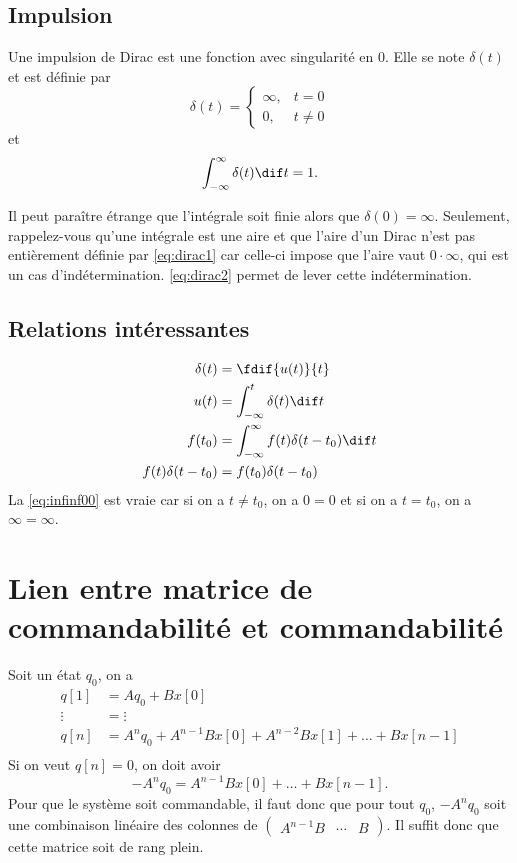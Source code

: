 \subsection{Impulsion}
\label{app:dirac}
Une impulsion de Dirac est une fonction avec singularité en 0.
Elle se note $\delta(t)$ et est définie par
\begin{equation}
  \label{eq:dirac1}
  \delta(t) =
  \begin{cases}
    \infty, & t = 0\\
    0, & t \neq 0
  \end{cases}
\end{equation}
et
\begin{equation}
  \label{eq:dirac2}
  \int_{-\infty}^{\infty} \delta(t) \dif t = 1.
\end{equation}

Il peut paraître étrange que l'intégrale soit finie alors que
$\delta(0) = \infty$.
Seulement, rappelez-vous qu'une intégrale est une aire et que
l'aire d'un Dirac n'est pas entièrement définie par \eqref{eq:dirac1}
car celle-ci impose que l'aire vaut $0 \cdot \infty$, qui est un cas
d'indétermination.
\eqref{eq:dirac2} permet de lever cette indétermination.

\subsection{Relations intéressantes}
\begin{align}
  \nonumber
  \delta(t) & = \fdif{u(t)}{t}\\
  \label{eq:uintdelta}
  u(t) & = \int_{-\infty}^t \delta(t) \dif t\\
  \nonumber
  f(t_0) & = \int_{-\infty}^\infty f(t)\delta(t-t_0) \dif t\\
  \label{eq:infinf00}
  f(t) \delta(t-t_0) & = f(t_0)\delta(t-t_0)
\end{align}
La \eqref{eq:infinf00} est vraie car si on a $t \neq t_0$, on a $0 = 0$
et si on a $t = t_0$, on a $\infty = \infty$.

\section{Lien entre matrice de commandabilité et commandabilité}
\label{ann:command}
Soit un état $q_0$, on a
\begin{align*}
  q[1] & = A q_0 + B x[0]\\
  \vdots & = \vdots\\
  q[n] & = A^nq_0 + A^{n-1}Bx[0] + A^{n-2}Bx[1] + \ldots + Bx[n-1]\\
\end{align*}
Si on veut $q[n] = 0$, on doit avoir
\[ -A^nq_0 = A^{n-1}Bx[0] + \ldots + Bx[n-1]. \]
Pour que le système soit commandable,
il faut donc que pour tout $q_0$, $-A^nq_0$ soit une combinaison
linéaire des colonnes de $\begin{pmatrix}A^{n-1}B & \cdots & B\end{pmatrix}$.
Il suffit donc %
que cette matrice soit de rang plein.


\biblio


